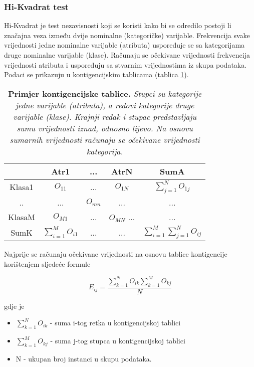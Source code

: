 \subsubsection{Hi-Kvadrat test}
Hi-Kvadrat je test nezavisnosti koji se koristi kako bi se odredilo postoji li značajna veza između dvije nominalne (kategoričke) varijable. Frekvencija svake vrijednosti jedne nominalne varijable (atributa) uspoređuje se sa kategorijama druge nominalne varijable (klase). Računaju se očekivane vrijednosti frekvencija vrijednosti atributa i uspoređuju sa stvarnim vrijednostima iz skupa podataka. Podaci se prikazuju u kontigencijskim tablicama (tablica \ref{tab:contig}).
\begin{center}
    \begin{table}[!ht]
    \caption[Kontigencijska tablica]{
    \label{tab:contig}
    \textbf{Primjer kontigencijske tablice.} \textit{Stupci su kategorije jedne varijable (atributa), a redovi kategorije druge varijable (klase). Krajnji redak i stupac predstavljaju sumu vrijednosti iznad, odnosno lijevo. Na osnovu sumarnih vrijednosti računaju se očekivane vrijednosti kategorija.}}
   \centering
   \begin{tabular}{||c | c | c | c | c ||}
   \hline
     & Atr1 & ... & AtrN & SumA \\ [0.5ex]
   \hline\hline
   Klasa1 & $O_{11}$ & ... & $O_{1N}$ & $\sum_{j=1}^{N}O_{1j}$ \\
   ..     & ...    & $O_{mn}$ & ... & ... \\
   KlasaM & $O_{M1}$ & ... & $O_{MN}$ ... & ... \\ 
   \hline
   SumK & $\sum_{i=1}^{M}O_{i1}$ & ... & ... & $\sum_{i=1}^{M}\sum_{j=1}^{N}O_{ij}$ \\ [1ex]

    \hline
    \end{tabular}
    \end{table}
\end{center}
Najprije se računaju očekivane vrijednosti na osnovu tablice kontigencije korištenjem sljedeće formule

\begin{equation}\label{eq:chiexpect}
E_{ij} = \frac{\sum_{k=1}^{N}O_{ik}\sum_{k=1}^{M}O_{kj}}{N}
\end{equation}

gdje je 

\begin{itemize}
    \item $\sum_{k=1}^{N}O_{ik}$ - suma i-tog retka u kontigencijskoj tablici
    \item $\sum_{k=1}^{M}O_{kj}$ - suma j-tog stupca u kontigencijskoj tablici
    \item N - ukupan broj instanci u skupu podataka.
\end{itemize}

